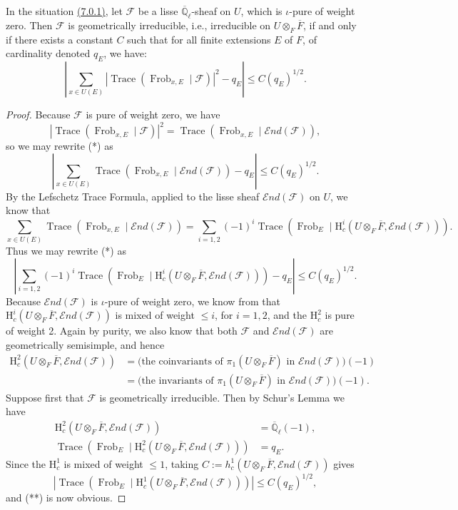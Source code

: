 In the situation \hyperref[par:7.0.1]{(7.0.1)}, let \(\mathcal{F}\) be a lisse \(\overline{\mathbb{Q}}_\ell\)-sheaf on \(U\), which is \(\iota\)-pure of weight zero. Then \(\mathcal{F}\) is geometrically irreducible, i.e., irreducible on \(U\otimes_F\overline{F}\), if and only if there exists a constant \(C\) such that for all finite extensions \(E\) of \(F\), of cardinality denoted \(q_E\), we have:
\[
\tag{*}
\left|\sum_{x\in U(E)}|\operatorname{Trace}(\operatorname{Frob}_{x,E}\mid\mathcal{F})|^2-q_E\right|\leq C(q_E)^{1/2}.
\]
\begin{proof}
Because \(\mathcal{F}\) is pure of weight zero, we have
\[
|\operatorname{Trace}(\operatorname{Frob}_{x,E}\mid\mathcal{F})|^2
=\operatorname{Trace}(\operatorname{Frob}_{x,E}\mid\mathcal{E}nd(\mathcal{F})),
\]
so we may rewrite (*) as
\[
\left|\sum_{x\in U(E)}\operatorname{Trace}(\operatorname{Frob}_{x,E}\mid\mathcal{E}nd(\mathcal{F}))-q_E\right|\leq C(q_E)^{1/2}.
\]
By the Lefschetz Trace Formula, applied to the lisse sheaf \(\mathcal{E}nd(\mathcal{F})\) on \(U\), we know that
\[
\sum_{x\in U(E)}\operatorname{Trace}(\operatorname{Frob}_{x,E}\mid\mathcal{E}nd(\mathcal{F}))
=\sum_{i=1,2}(-1)^i\operatorname{Trace}(\operatorname{Frob}_E\mid\mathrm{H}^i_c(U\otimes_F\overline{F},\mathcal{E}nd(\mathcal{F}))).
\]
Thus we may rewrite (*) as
\[
\tag{**}
\left|\sum_{i=1,2}(-1)^i\operatorname{Trace}(\operatorname{Frob}_E\mid\mathrm{H}^i_c(U\otimes_F\overline{F},\mathcal{E}nd(\mathcal{F})))-q_E\right|\leq C(q_E)^{1/2}.
\]
Because \(\mathcal{E}nd(\mathcal{F})\) is \(\iota\)-pure of weight zero, we know from \cite[3.3.1]{De-WeilII} that \(\mathrm{H}^i_c(U\otimes_F\overline{F},\mathcal{E}nd(\mathcal{F}))\) is mixed of weight \(\leq i\), for \(i=1,2\), and the \(\mathrm{H}^2_c\) is pure of weight 2. Again by purity, we also know \cite[3.4.1(iii)]{De-WeilII} that both \(\mathcal{F}\) and \(\mathcal{E}nd(\mathcal{F})\) are geometrically semisimple, and hence
\[
\begin{aligned}
\mathrm{H}^2_c(U\otimes_F\overline{F},\mathcal{E}nd(\mathcal{F}))
&=\text{(the coinvariants of }\pi_1(U\otimes_F\overline{F})\text{ in }\mathcal{E}nd(\mathcal{F}))(-1)\\
&=\text{(the invariants of }\pi_1(U\otimes_F\overline{F})\text{ in }\mathcal{E}nd(\mathcal{F}))(-1).
\end{aligned}
\]
Suppose first that \(\mathcal{F}\) is geometrically irreducible. Then by Schur's Lemma we have
\[
\begin{aligned}
\mathrm{H}^2_c(U\otimes_F\overline{F},\mathcal{E}nd(\mathcal{F}))&=\overline{\mathbb{Q}}_\ell(-1),\\
\operatorname{Trace}(\operatorname{Frob}_E\mid\mathrm{H}^2_c(U\otimes_F\overline{F},\mathcal{E}nd(\mathcal{F})))&=q_E.
\end{aligned}
\]
Since the \(\mathrm{H}^1_c\) is mixed of weight \(\leq 1\), taking \(C:=h^1_c(U\otimes_F\overline{F},\mathcal{E}nd(\mathcal{F}))\) gives
\[
\left|\operatorname{Trace}(\operatorname{Frob}_E\mid\mathrm{H}^1_c(U\otimes_F\overline{F},\mathcal{E}nd(\mathcal{F})))\right|\leq C(q_E)^{1/2},
\]
and (**) is now obvious.


\end{proof}
